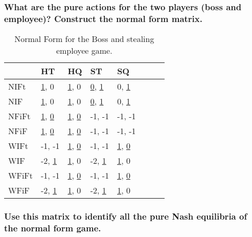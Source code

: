 \subsubsection{What are the pure actions for the two players (boss and employee)? Construct the normal
form matrix.}


\begin{table}[h!]
  \centering
  \begin{tabular}{|l|l|l|l|l|l|l|l|}
    \hline
    & HT                                    & HQ                            & ST   & SQ   \\ \hline
    NIFt  & \underline{1}, 0                & \underline{1}, 0              & \underline{0}, \underline{1}   & 0, \underline{1}             \\ \hline
    NIF   & \underline{1}, 0                & \underline{1}, 0              & \underline{0}, \underline{1}   & 0, \underline{1}             \\ \hline
    NFiFt & \underline{1}, \underline{0}    & \underline{1}, \underline{0}  & -1, -1                         & -1, -1                       \\ \hline
    NFiF  & \underline{1}, \underline{0}    & \underline{1}, \underline{0}  & -1, -1                         & -1, -1                       \\ \hline
    WIFt  & -1, -1                          & \underline{1}, \underline{0}  & -1, -1                         & \underline{1}, \underline{0} \\ \hline
    WIF   & -2, \underline{1}               & \underline{1}, 0              & -2, \underline{1}              & \underline{1}, 0             \\ \hline
    WFiFt & -1, -1                          & \underline{1}, \underline{0}  & -1, -1                         & \underline{1}, \underline{0} \\ \hline
    WFiF  & -2, \underline{1}               & \underline{1}, 0              & -2, \underline{1}              & \underline{1}, 0             \\ \hline


  \end{tabular}
  \caption{Normal Form for the Boss and stealing employee game.}
  \label{lt2}
\end{table}


\subsubsection{Use this matrix to identify all the pure Nash equilibria of the normal form game.}

